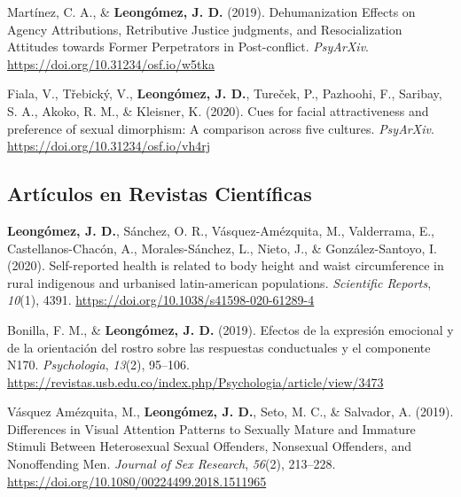 \documentclass[11pt, a4paper]{awesome-cv}
\begin{document}
\leavevmode\hypertarget{ref-Martinez2019}{}%
Martínez, C. A., \& \textbf{Leongómez, J. D.} (2019). Dehumanization
{Effects} on {Agency Attributions}, {Retributive Justice} judgments, and
{Resocialization Attitudes} towards {Former Perpetrators} in
{Post}-conflict. \emph{PsyArXiv}.
\url{https://doi.org/10.31234/osf.io/w5tka}

\leavevmode\hypertarget{ref-Fiala2020}{}%
Fiala, V., Třebický, V., \textbf{Leongómez, J. D.}, Tureček, P.,
Pazhoohi, F., Saribay, S. A., Akoko, R. M., \& Kleisner, K. (2020). Cues
for facial attractiveness and preference of sexual dimorphism: {A}
comparison across five cultures. \emph{PsyArXiv}.
\url{https://doi.org/10.31234/osf.io/vh4rj}

\endgroup

\hypertarget{artuxedculos-en-revistas-cientuxedficas}{%
\subsection{Artículos en Revistas
Científicas}\label{artuxedculos-en-revistas-cientuxedficas}}

\begingroup
\setlength{\parindent}{-0.5in}
\setlength{\leftskip}{0.5in}

\hypertarget{refs_journals}{}
\leavevmode\hypertarget{ref-Leonguxf3mez2020}{}%
\textbf{Leongómez, J. D.}, Sánchez, O. R., Vásquez-Amézquita, M.,
Valderrama, E., Castellanos-Chacón, A., Morales-Sánchez, L., Nieto, J.,
\& González-Santoyo, I. (2020). Self-reported health is related to body
height and waist circumference in rural indigenous and urbanised
latin-american populations. \emph{Scientific Reports}, \emph{10}(1),
4391. \url{https://doi.org/10.1038/s41598-020-61289-4}

\leavevmode\hypertarget{ref-BonillaCarreno2019}{}%
Bonilla, F. M., \& \textbf{Leongómez, J. D.} (2019). {Efectos de la
expresi{ó}n emocional y de la orientaci{ó}n del rostro sobre las
respuestas conductuales y el componente N170}. \emph{Psychologia},
\emph{13}(2), 95--106.
\url{https://revistas.usb.edu.co/index.php/Psychologia/article/view/3473}

\leavevmode\hypertarget{ref-VasquezAmezquita2019}{}%
Vásquez Amézquita, M., \textbf{Leongómez, J. D.}, Seto, M. C., \&
Salvador, A. (2019). {Differences in Visual Attention Patterns to
Sexually Mature and Immature Stimuli Between Heterosexual Sexual
Offenders, Nonsexual Offenders, and Nonoffending Men}. \emph{Journal of
Sex Research}, \emph{56}(2), 213--228.
\url{https://doi.org/10.1080/00224499.2018.1511965}
\end{document}

